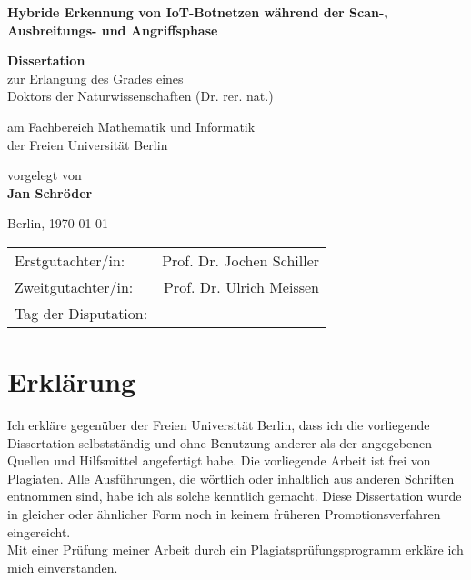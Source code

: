 \documentclass[
    a4paper,
    pagesize,
	pdftex,
    12pt,
    fleqn,
    final
]{scrartcl}
\begin{document}
\begin{titlepage}
    \begin{center}

        \Huge
        \textbf{Hybride Erkennung von IoT-Botnetzen während der Scan-, Ausbreitungs- und Angriffsphase}
             
        \vspace{1.5cm}

        \LARGE
        \textbf{Dissertation} \\  
        \large
        zur Erlangung des Grades eines\\
        Doktors der Naturwissenschaften (Dr. rer. nat.)

        \vspace{1.5cm}
        am Fachbereich Mathematik und Informatik\\
        der Freien Universität Berlin\\
        
        \vspace{1.5cm}

        vorgelegt von \\
        \Large
        \textbf{Jan Schröder}
      
        \vspace{1.5cm}    
        \large
        Berlin, \today\\
        
        \newpage
    \end{center}

    \large
    \begin{tabularx}{\textwidth}{X r}
        Erstgutachter/in: & Prof. Dr. Jochen Schiller \\
        Zweitgutachter/in: & Prof. Dr. Ulrich Meissen \\
        Tag der Disputation: & \\
    \end{tabularx}

    
\end{titlepage}

\fontsize{13}{0}\selectfont

\section*{Erklärung}

Ich erkläre gegenüber der Freien Universität Berlin, dass ich die vorliegende
Dissertation selbstständig und ohne Benutzung anderer als der angegebenen
Quellen und Hilfsmittel angefertigt habe. Die vorliegende Arbeit ist frei von
Plagiaten. Alle Ausführungen, die wörtlich oder inhaltlich aus anderen Schriften
entnommen sind, habe ich als solche kenntlich gemacht. Diese Dissertation
wurde in gleicher oder ähnlicher Form noch in keinem früheren Promotionsverfahren eingereicht. \\[0.2in]
Mit einer Prüfung meiner Arbeit durch ein Plagiatsprüfungsprogramm erkläre
ich mich einverstanden. \\[0.4in]
\end{document}
